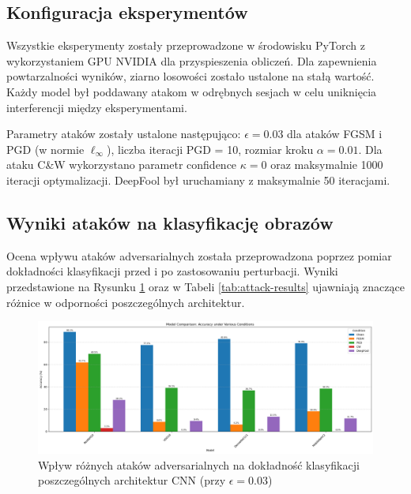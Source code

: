 \documentclass[12pt]{article}
\begin{document}
\subsection{Konfiguracja eksperymentów}

Wszystkie eksperymenty zostały przeprowadzone w środowisku PyTorch z wykorzystaniem GPU NVIDIA dla przyspieszenia obliczeń. Dla zapewnienia powtarzalności wyników, ziarno losowości zostało ustalone na stałą wartość. Każdy model był poddawany atakom w odrębnych sesjach w celu uniknięcia interferencji między eksperymentami.

Parametry ataków zostały ustalone następująco: $\epsilon = 0.03$ dla ataków FGSM i PGD (w normie $\ell_\infty$), liczba iteracji PGD = 10, rozmiar kroku $\alpha = 0.01$. Dla ataku C\&W wykorzystano parametr confidence $\kappa = 0$ oraz maksymalnie 1000 iteracji optymalizacji. DeepFool był uruchamiany z maksymalnie 50 iteracjami.

\subsection{Wyniki ataków na klasyfikację obrazów}

Ocena wpływu ataków adversarialnych została przeprowadzona poprzez pomiar dokładności klasyfikacji przed i po zastosowaniu perturbacji. Wyniki przedstawione na Rysunku \ref{fig:model-comparison} oraz w Tabeli \ref{tab:attack-results} ujawniają znaczące różnice w odporności poszczególnych architektur.
\begin{figure}[H]
    \centering
    \includegraphics[width=1\textwidth]{model_comparison.png}
    \caption{Wpływ różnych ataków adversarialnych na dokładność klasyfikacji poszczególnych architektur CNN (przy $\epsilon = 0.03$)}
    \label{fig:model-comparison}
\end{figure}
\end{document}
